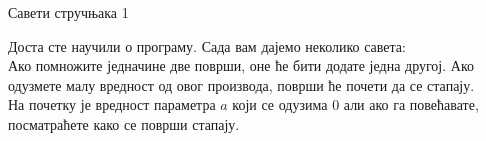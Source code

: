 \documentclass[sr]{./../../common/SurferDesc}%
\begin{document}
\footnotesize
%

\begin{surferPage}
  \begin{surferTitle}Савети стручњака 1\end{surferTitle}
   \begin{surferText}

Доста сте научили о програму. Сада вам дајемо неколико савета:\\
\vspace{0.3cm}
Ако помножите једначине две површи, оне ће бити додате једна другој. Ако одузмете малу вредност од овог производа, површи ће почети да се стапају.\\
\vspace{0.3cm}
На почетку је вредност параметра $a$ који се одузима 0 али ако га повећавате, посматраћете како се површи стапају.

   \end{surferText}
\end{surferPage}

 
\end{document}
